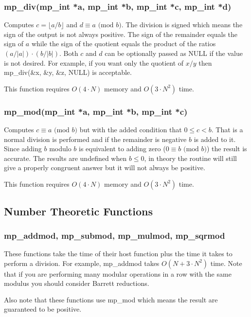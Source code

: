 \documentclass[]{article}
\begin{document}
\subsubsection{mp\_div(mp\_int *a, mp\_int *b, mp\_int *c, mp\_int *d)}
Computes $c = \lfloor a/b \rfloor$ and $d \equiv a \mbox{ (mod }b\mbox{)}$.  The division is signed which means the sign
of the output is not always positive.  The sign of the remainder equals the sign of $a$ while the sign of the 
quotient equals the product of the ratios $(a/\vert a \vert) \cdot (b/\vert b \vert)$.  Both $c$ and $d$ can be 
optionally passed as NULL if the value is not desired.  For example, if you want only the quotient of $x/y$ then 
mp\_div(\&x, \&y, \&z, NULL) is acceptable.

This function requires $O(4 \cdot N)$ memory and $O(3 \cdot N^2)$ time.

\subsubsection{mp\_mod(mp\_int *a, mp\_int *b, mp\_int *c)}
Computes $c \equiv a \mbox{ (mod }b\mbox{)}$ but with the added condition that $0 \le c < b$.  That is a normal 
division is performed and if the remainder is negative $b$ is added to it.  Since adding $b$ modulo $b$ is equivalent
to adding zero ($0 \equiv b \mbox{ (mod }b\mbox{)}$) the result is accurate.  The results are undefined 
when $b \le 0$, in theory the routine will still give a properly congruent answer but it will not always be positive. 

This function requires $O(4 \cdot N)$ memory and $O(3 \cdot N^2)$ time.

\subsection{Number Theoretic Functions}

\subsubsection{mp\_addmod, mp\_submod, mp\_mulmod, mp\_sqrmod}
These functions take the time of their host function plus the time it takes to perform a division.  For example, 
mp\_addmod takes $O(N + 3 \cdot N^2)$ time.  Note that if you are performing many modular operations in a row with
the same modulus you should consider Barrett reductions.  

Also note that these functions use mp\_mod which means the result are guaranteed to be positive.
\end{document}
